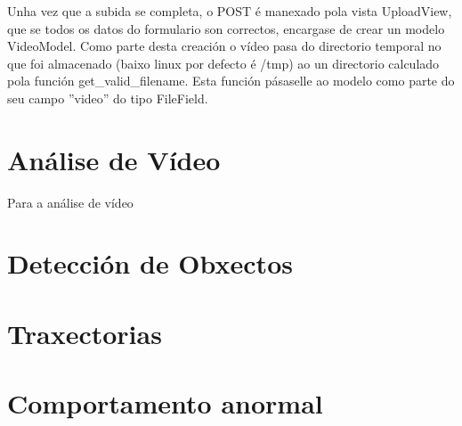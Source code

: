 	Unha vez que a subida se completa, o POST é manexado pola vista UploadView, que se todos
	os datos do formulario son correctos, encargase de crear un modelo VideoModel. Como parte
	desta creación o vídeo pasa do directorio temporal no que foi almacenado (baixo linux por 
	defecto é /tmp) ao un directorio calculado pola función get\_valid\_filename. Esta función
	pásaselle ao modelo como parte do seu campo ''video'' do tipo FileField.
	
\section{Análise de Vídeo}
	Para a análise de vídeo

\section{Detección de Obxectos}

\section{Traxectorias}

\section{Comportamento anormal}
